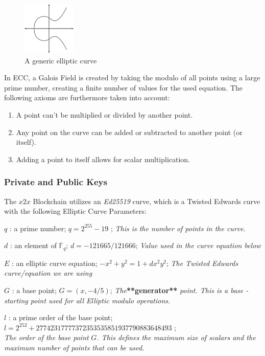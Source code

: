 \begin{figure}
\includegraphics[height=1in, width=1in]{elliptic_bn}
\caption{A generic elliptic curve}
\label{fig:elliptic}
\end{figure}

In ECC, a Galois Field is created by taking the modulo of all points using a large prime number, creating a finite number of values for the used equation. The following axioms are furthermore taken into account:

\begin{enumerate}
\item A point can't be multiplied or divided by another point.
\item Any point on the curve can be added or subtracted to another point (or itself).
\item Adding a point to itself allows for scalar multiplication.
\end{enumerate}

\subsubsection{Private and Public Keys}

The $x2x$ Blockchain utilizes an \textit{Ed25519} curve, which is a Twisted Edwards curve with the following Elliptic Curve Parameters:

$q$ : a prime number; $q=2^{255}-19$ ; \textit{This is the number of points in the curve.}

$d$ : an element of $\mathbb{F}_q$; $d=-121665/121666$; \textit{Value used in the curve equation below}

$E$ : an elliptic curve equation; $-x^2+y^2=1+dx^2y^2$; \textit{The Twisted Edwards curve/equation we are using}

$G$ : a base point; $G=(x, -4/5)$; \textit{The}\textbf{**generator**} \textit{point. This is a base - starting point used for all Elliptic modulo operations.}

$l$ : a prime order of the base point; \\\space\space\space\space$l=2^{252}+27742317777372353535851937790883648493$ ;\\ \textit{The order of the base point} $G$\textit{. This defines the maximum size of scalars and the maximum number of points that can be used.}

